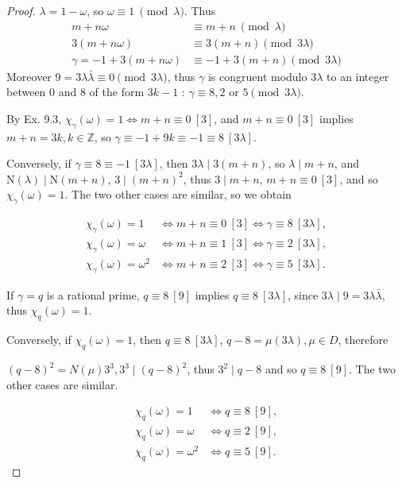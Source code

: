 \documentclass[11pt,a4paper]{article}
\newcommand{\Z}{\mathbb{Z}}
\newcommand{\n}{\mathrm{N}}
\begin{document}
\begin{proof}
$\lambda=1-\omega$, so $\omega\equiv1\ \pmod \lambda$. Thus
\begin{align*}
m+n\omega &\equiv m+n\ \pmod \lambda\\
3(m+n \omega) &\equiv 3 (m+n) \pmod{3\lambda}\\
\gamma = -1 + 3(m+n\omega) &\equiv -1+3(m+n) \pmod{3 \lambda}
\end{align*}
Moreover $9 = 3 \lambda \bar{\lambda} \equiv 0 \pmod{3 \lambda}$, thus $\gamma$ is congruent modulo $3\lambda$ to an integer between  $0$ and $8$ of the form $3k-1$ : $\gamma \equiv 8,2$ or $5 \pmod{3\lambda}$.

By Ex. 9.3, $\chi_\gamma(\omega) = 1 \iff m+n \equiv 0 \ [3]$, and $m+n  \equiv 0 \ [3]$ implies $m+n = 3k, k \in \Z$, so $\gamma  \equiv -1+ 9k \equiv -1 \equiv 8 \ [3\lambda]$.

Conversely, if $\gamma \equiv 8 \equiv -1 \ [3\lambda]$, then $3\lambda \mid 3(m+n)$, so $\lambda \mid m+n$, and $\n(\lambda) \mid\n(m+n)$, $3 \mid (m+n)^2$, thus $3 \mid m+n$,  $m+n \equiv 0 \ [3]$, and so $\chi_\gamma(\omega) = 1$. The two other cases are similar, so we obtain

\begin{align*}
\chi_\gamma(\omega) = 1 &\iff m+n \equiv 0\ [3] \iff \gamma \equiv 8 \ [3\lambda],\\
\chi_\gamma(\omega) = \omega &\iff m+n \equiv 1\ [3] \iff \gamma \equiv 2 \ [3\lambda],\\
\chi_\gamma(\omega) = \omega^2 &\iff m+n \equiv 2\ [3] \iff \gamma \equiv 5 \ [3\lambda].
\end{align*}

If $\gamma = q$ is a rational prime,
$q \equiv 8 \ [9]$ implies $q \equiv 8\ [3\lambda]$, since $3 \lambda \mid 9 = 3 \lambda \bar{\lambda}$, thus $\chi_q(\omega) = 1$.

Conversely, if $\chi_q(\omega) = 1$, then $q \equiv 8\ [3\lambda]$, $q-8 = \mu (3 \lambda), \mu \in D$, therefore 

$(q-8)^2 = N(\mu) 3^3, 3^3 \mid (q-8)^2$, thus $3^2 \mid q-8$ and so $q \equiv 8 \ [9]$. The two other cases are similar.

\begin{align*}
\chi_q(\omega) = 1 & \iff q \equiv 8 \ [9],\\
\chi_q(\omega) = \omega & \iff q \equiv 2 \ [9],\\
\chi_q(\omega) = \omega^2 &\iff q \equiv 5 \ [9].
\end{align*}
\end{proof}
\end{document}
